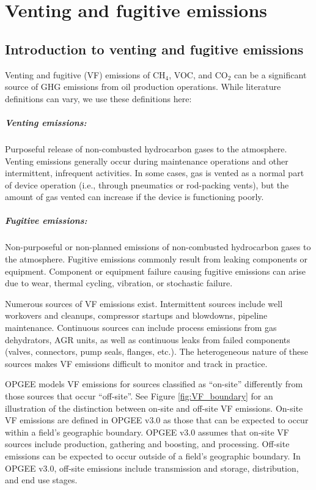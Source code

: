 \documentclass[11pt]{report}
\begin{document}
\clearpage

\chapter{Venting and fugitive emissions}\label{sec:VFF}

\section{Introduction to venting and fugitive emissions}

Venting and fugitive (VF) emissions of CH$_4$, VOC, and CO$_2$ can be a significant source of GHG emissions from oil production operations. While literature definitions can vary, we use these definitions here:

\paragraph{Venting emissions:} Purposeful release of non-combusted hydrocarbon gases to the atmosphere. Venting emissions generally occur during maintenance operations and other intermittent, infrequent activities. In some cases, gas is vented as a normal part of device operation (i.e., through pneumatics or rod-packing vents), but the amount of gas vented can increase if the device is functioning poorly.
\paragraph{Fugitive emissions:} Non-purposeful or non-planned emissions of non-combusted hydrocarbon gases to the atmosphere. Fugitive emissions commonly result from leaking components or equipment. Component or equipment failure causing fugitive emissions can arise due to wear, thermal cycling, vibration, or stochastic failure.

\vspace{0.1in}

Numerous sources of VF emissions exist. Intermittent sources include well workovers and cleanups, compressor startups and blowdowns, pipeline maintenance. Continuous sources can include process emissions from gas dehydrators, AGR units, as well as continuous leaks from failed components (valves, connectors, pump seals, flanges, etc.). The heterogeneous nature of these sources makes VF emissions difficult to monitor and track in practice.

OPGEE models VF emissions for sources classified as ``on-site'' differently from those sources that occur ``off-site''.  See Figure \ref{fig:VF_boundary} for an illustration of the distinction between on-site and off-site VF emissions. On-site VF emissions are defined in OPGEE v3.0 as those that can be expected to occur within a field's geographic boundary. OPGEE v3.0 assumes that on-site VF sources include production, gathering and boosting, and processing.  Off-site emissions can be expected to occur outside of a field's geographic boundary. In OPGEE v3.0, off-site emissions include transmission and storage, distribution, and end use stages.
\end{document}
